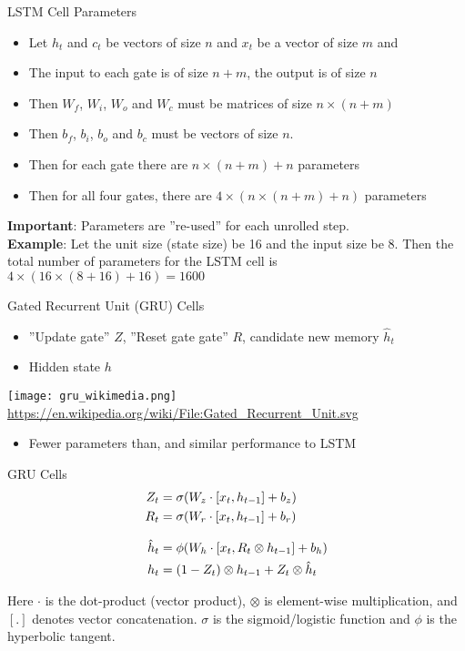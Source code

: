 \documentclass[ignorenonframetext,xcolor=x11names]{beamer}
\begin{document}
\begin{frame}{LSTM Cell Parameters}
\small
\begin{itemize}
  \item Let $h_t$ and $c_t$ be vectors of size $n$ and $x_t$ be a vector of size $m$ and 
  \item The input to each gate is of size $n+m$, the output is of size $n$
  \item Then $W_f$, $W_i$, $W_o$ and $W_c$ must be matrices of size $n \times (n+m)$
  \item Then $b_f$, $b_i$, $b_o$ and $b_c$ must be vectors of size $n$. 
  \item Then for each gate there are $n \times (n+m) + n$ parameters
  \item Then for all four gates, there are $4 \times (n \times (n+m) + n)$ parameters
\end{itemize}
\textbf{Important}: Parameters are ''re-used'' for each unrolled step.\\

\textbf{Example}: Let the unit size (state size) be 16 and the input size be 8. Then the total number of parameters for the LSTM cell is $4 \times (16 \times (8+16) + 16) = 1600$
\end{frame}

\begin{frame}{Gated Recurrent Unit (GRU) Cells}
\begin{itemize}
   \item ''Update gate'' $Z$, ''Reset gate gate'' $R$, candidate new memory $\hat{h}_t$
   \item Hidden state $h$
\end{itemize}
\begin{center}
\texttt{[image: gru\_wikimedia.png]}
\scriptsize \url{https://en.wikipedia.org/wiki/File:Gated_Recurrent_Unit.svg} \normalsize
\end{center}
\begin{itemize}
   \item Fewer parameters than, and similar performance to LSTM
\end{itemize}
\end{frame}

\begin{frame}{GRU Cells}
\begin{align*}
Z_t &= \sigma (W_z \cdot [x_t, h_{t-1}] + b_z) \\
R_t &= \sigma (W_r \cdot [x_t, h_{t-1}] + b_r) \\[.5\baselineskip]
\hat{h}_t &= \phi (W_h \cdot [x_t, R_t \otimes h_{t-1}] + b_h) \\
h_t &= (1 - Z_t) \otimes h_{t-1} + Z_t \otimes \hat{h}_t
\end{align*}

\small
Here $\cdot$ is the dot-product (vector product), $\otimes$ is element-wise multiplication, and $[.]$ denotes vector concatenation.  $\sigma$ is the sigmoid/logistic function and $\phi$ is the hyperbolic tangent.
\end{frame}
\end{document}
